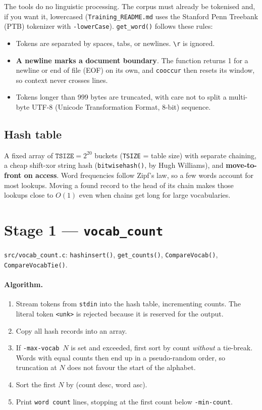 \documentclass[11pt,a4paper]{article}
\newcommand{\file}[1]{\texttt{#1}}
\newcommand{\fn}[1]{\texttt{#1()}}
\newcommand{\opt}[1]{\texttt{-#1}}
\begin{document}
The tools do no linguistic processing. The corpus must already be tokenised and, if you
want it, lowercased (\file{Training\_README.md} uses the Stanford Penn Treebank (PTB) tokenizer with
\texttt{-lowerCase}). \fn{get\_word} follows these rules:
\begin{itemize}[nosep]
  \item Tokens are separated by spaces, tabs, or newlines. \texttt{\textbackslash r} is ignored.
  \item \textbf{A newline marks a document boundary}. The function returns 1 for a newline
        or end of file (EOF) on its own, and \texttt{cooccur} then resets its window, so context never
        crosses lines.
  \item Tokens longer than 999 bytes are truncated, with care not to split a multi-byte
        UTF-8 (Unicode Transformation Format, 8-bit) sequence.
\end{itemize}

\subsection{Hash table}

A fixed array of $\texttt{TSIZE}=2^{20}$ buckets (\texttt{TSIZE} = table size) with separate chaining, a cheap
shift-xor string hash (\fn{bitwisehash}, by Hugh Williams), and
\textbf{move-to-front on access}. Word frequencies follow Zipf's law, so a few words
account for most lookups. Moving a found record to the head of its chain makes those
lookups close to $O(1)$ even when chains get long for large vocabularies.

\section{Stage 1 --- \texttt{vocab\_count}}

\begin{codeloc}
\file{src/vocab\_count.c}: \fn{hashinsert}, \fn{get\_counts}, \fn{CompareVocab},
\fn{CompareVocabTie}.
\end{codeloc}

\paragraph{Algorithm.}
\begin{enumerate}[nosep]
  \item Stream tokens from \texttt{stdin} into the hash table, incrementing counts. The
        literal token \texttt{<unk>} is rejected because it is reserved for the output.
  \item Copy all hash records into an array.
  \item If \opt{max-vocab}~$N$ is set and exceeded, first sort by count \emph{without} a
        tie-break. Words with equal counts then end up in a pseudo-random order, so
        truncation at $N$ does not favour the start of the alphabet.
  \item Sort the first $N$ by (count desc, word asc).
  \item Print \texttt{word count} lines, stopping at the first count below \opt{min-count}.
\end{enumerate}
\end{document}
